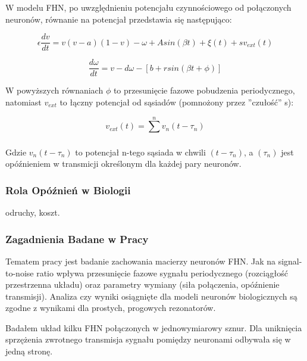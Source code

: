   W modelu FHN, po uwzględnieniu potencjału czynnościowego od połączonych neuronów, równanie na potencjał przedstawia się następująco:

  \begin{equation} \label{eq:v2}
    \epsilon \frac{dv}{dt} = v(v-a)(1-v)- \omega + A sin(\beta t) + \xi(t) + sv_{ext}(t)
  \end{equation}

  \begin{equation} \label{eq:w2}
    \frac{d \omega}{dt} = v - d \omega - [b + r sin(\beta t + \phi)]
  \end{equation}

  W powyższych równaniach $\phi$ to przesunięcie fazowe pobudzenia periodycznego, natomiast $v_{ext}$ to łączny potencjał od sąsiadów (pomnożony przez ''czułość'' s):

  \begin{equation}
    v_{ext}(t) = \displaystyle\sum\limits_{}^n v_{n}(t-\tau_{n})
  \end{equation}

  Gdzie $v_{n}(t-\tau_{n})$ to potencjał n-tego sąsiada w chwili $(t-\tau_{n})$, a $(\tau_{n})$ jest opóźnieniem w transmicji określonym dla każdej pary neuronów.


  \subsubsection{Rola Opóźnień w Biologii}
  odruchy, koszt.
  
  \subsubsection{Zagadnienia Badane w Pracy}

  Tematem pracy jest badanie zachowania macierzy neuronów FHN. Jak na signal-to-noise ratio wpływa przesunięcie fazowe sygnału periodycznego (rozciągłość przestrzenna układu) oraz parametry wymiany (siła połączenia, opóźnienie transmisji). Analiza czy wyniki osiągnięte dla modeli neuronów biologicznych są zgodne z wynikami dla prostych, progowych rezonatorów.

  Badałem układ kilku FHN połączonych w jednowymiarowy sznur. Dla uniknięcia sprzężenia zwrotnego  transmisja sygnału pomiędzy neuronami odbywała się w jedną stronę.
